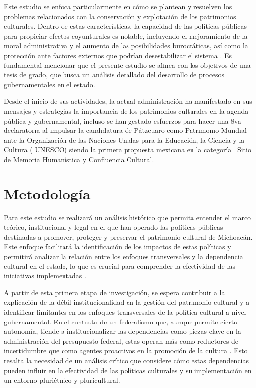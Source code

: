 \documentclass[
  spanish,
  11pt,
  a4paper,
]{scrbook}
\begin{document}
Este estudio se enfoca particularmente en cómo se plantean y resuelven
los problemas relacionados con la conservación y explotación de los
patrimonios culturales. Dentro de estas características, la capacidad de
las políticas públicas para propiciar efectos coyunturales es notable,
incluyendo el mejoramiento de la moral administrativa y el aumento de
las posibilidades burocráticas, así como la protección ante factores
externos que podrían desestabilizar el sistema \autocite{Hernandis2016}.
Es fundamental mencionar que el presente estudio se alinea con los
objetivos de una tesis de grado, que busca un análisis detallado del
desarrollo de procesos gubernamentales en el estado.

Desde el inicio de sus actividades, la actual administración ha
manifestado en sus mensajes y estrategias la importancia de los
patrimonios culturales en la agenda pública y gubernamental, incluso se
han gestado esfuerzos para hacer una 8va declaratoria al impulsar la
candidatura de Pátzcuaro como Patrimonio Mundial ante la Organización de
las Naciones Unidas para la Educación, la Ciencia y la Cultura ( UNESCO)
siendo la primera propuesta mexicana en la categoría ~Sitio de Memoria
Humanística y Confluencia Cultural.

\section*{Metodología}\label{metodologuxeda-2}


Para este estudio se realizará un análisis histórico que permita
entender el marco teórico, institucional y legal en el que han operado
las políticas públicas destinadas a promover, proteger y preservar el
patrimonio cultural de Michoacán. Este enfoque facilitará la
identificación de los impactos de estas políticas y permitirá analizar
la relación entre los enfoques transversales y la dependencia cultural
en el estado, lo que es crucial para comprender la efectividad de las
iniciativas implementadas \autocite{Cantar2021}.

A partir de esta primera etapa de investigación, se espera contribuir a
la explicación de la débil institucionalidad en la gestión del
patrimonio cultural y a identificar limitantes en los enfoques
transversales de la política cultural a nivel gubernamental. En el
contexto de un federalismo que, aunque permite cierta autonomía, tiende
a institucionalizar las dependencias como piezas clave en la
administración del presupuesto federal, estas operan más como reductores
de incertidumbre que como agentes proactivos en la promoción de la
cultura \autocite{Harguindeguy2023}. Esto resalta la necesidad de un
análisis crítico que considere cómo estas dependencias pueden influir en
la efectividad de las políticas culturales y su implementación en un
entorno pluriétnico y pluricultural.
\end{document}
